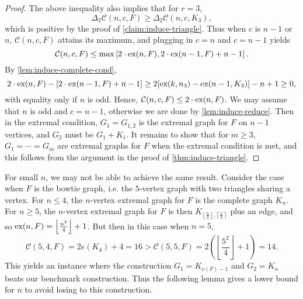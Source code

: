 \documentclass[12pt]{report}
\newtheorem{corollary}[theorem]{Corollary}
\newcommand*{\ex}{\textnormal{ex}}
\newcommand*{\dex}{\textnormal{ex}_2}
\newcommand*{\con}{\mathcal{C}}
\begin{document}
\begin{proof}
  The above inequality also implies that for $r = 3$,
  \[
    \Delta_2 \con(n, c, F) \geq \Delta_2 \con(n, c, K_3),
  \]
  which is positive by the proof of \cref{claim:induce-triangle}. Thus when $c$ is $n - 1$ or $n$, $\con(n, c, F)$ attains its maximum, and plugging in $c = n$ and $c = n -1$ yields 
  \[
    \con(n, c, F) \leq \max\left[2 \cdot \ex(n, F), 2 \cdot \ex(n - 1, F) + n - 1\right].
  \]
  By \cref{lem:induce-complete-cond},
  \[
    2 \cdot \ex(n, F) - [2 \cdot \ex(n - 1, F) + n - 1] \geq 2[\ex(k, n_{3}) - \ex(n - 1, K_{3})] - n + 1 \geq 0,
  \]
  with equality only if $n$ is odd. Hence, $\con(n, c, F) \leq 2 \cdot \ex(n, F)$. We may assume that $n$ is odd and $c = n - 1$, otherwise we are done by \cref{lem:induce-reduce}. Then in the extremal condition, $G_1 = G_{1, 2}$ is the extremal graph for $F$ on $n - 1$ vertices, and $G_2$ must be $G_1 + K_1$. It remains to show that for $m \geq 3$, $G_1 = \cdots = G_m$ are extremal graphs for $F$ when the extremal condition is met, and this follows from the argument in the proof of \cref{thm:induce-triangle}.
\end{proof}




For small $n$, we may not be able to achieve the same result. Consider the case when $F$ is the bowtie graph, i.e. the $5$-vertex graph with two triangles sharing a vertex. For $n \leq 4$, the $n$-vertex extremal graph for $F$ is the complete graph $K_n$. For $n \geq 5$, the $n$-vertex extremal graph for $F$ is then $K_{\left\lfloor\frac{n}{2}\right\rfloor, \left\lceil\frac{n}{2}\right\rceil}$ plus an edge, and so $\ex(n, F) = \left\lfloor\frac{n^2}{4}\right\rfloor + 1$. But then in this case when $n = 5$, 
\[
  \con(5, 4, F) = 2e(K_4) + 4 = 16 > \con(5, 5, F) = 2\left(\left\lfloor\frac{5^2}{4}\right\rfloor + 1\right) = 14.
\]
This yields an instance where the construction $G_1 = K_{v(F) - 1}$ and $G_2 = K_n$ beats our benchmark construction. Thus the following lemma gives a lower bound for $n$ to avoid losing to this construction.
\end{document}
